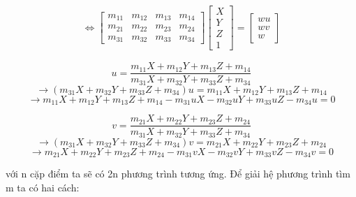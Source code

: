 \documentclass[11pt]{article}
\begin{document}
\begin{align*} 
    \Leftrightarrow
    \begin{bmatrix}
        \mathit{m}_{11} & \mathit{m}_{12} & \mathit{m}_{13} & \mathit{m}_\mathit{14} \\
        \mathit{m}_{21} & \mathit{m}_{22} & \mathit{m}_{23} & \mathit{m}_\mathit{24} \\
        \mathit{m}_{31} & \mathit{m}_{32} & \mathit{m}_{33} & \mathit{m}_\mathit{34}
    \end{bmatrix}
    \begin{bmatrix}
        \mathit{X}\\
        \mathit{Y}\\
        \mathit{Z}\\
        1
    \end{bmatrix}
    =
    \begin{bmatrix}
        \mathit{w}\mathit{u} \\
        \mathit{w}\mathit{v} \\
        \mathit{w}
    \end{bmatrix}
\end{align*}

\begin{equation*}
    u = \dfrac{m_{11}X + m_{12}Y + m_{13}Z + m_{14}}{m_{31}X + m_{32}Y + m_{33}Z + m_{34}}
\end{equation*}
\begin{equation*}
    \rightarrow (m_{31}X + m_{32}Y + m_{33}Z + m_{34})u = m_{11}X + m_{12}Y + m_{13}Z + m_{14}
\end{equation*}
\begin{equation*}
    \rightarrow m_{11}X + m_{12}Y + m_{13}Z + m_{14} - m_{31}uX - m_{32}uY + m_{33}uZ - m_{34}u = 0
\end{equation*}

\begin{equation*}
    v = \dfrac{m_{21}X + m_{22}Y + m_{23}Z + m_{24}}{m_{31}X + m_{32}Y + m_{33}Z + m_{34}}
\end{equation*}
\begin{equation*}
    \rightarrow (m_{31}X + m_{32}Y + m_{33}Z + m_{34})v = m_{21}X + m_{22}Y + m_{23}Z + m_{24}
\end{equation*}
\begin{equation*}
    \rightarrow m_{21}X + m_{22}Y + m_{23}Z + m_{24} - m_{31}vX - m_{32}vY + m_{33}vZ - m_{34}v = 0
\end{equation*}

với n cặp điểm ta sẽ có 2n phương trình tương ứng. Để giải hệ phương trình tìm m ta có hai cách:
\end{document}
